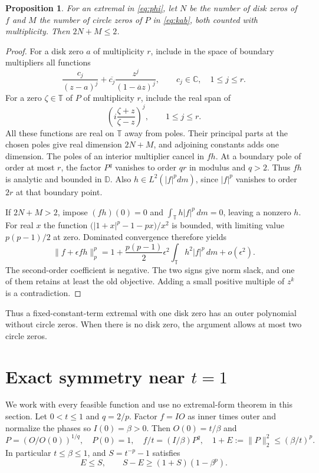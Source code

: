 \documentclass[11pt]{article}
\numberwithin{equation}{section}
\newtheorem{proposition}[theorem]{Proposition}
\theoremstyle{remark}
\newcommand{\D}{\mathbb D}
\newcommand{\T}{\mathbb T}
\newcommand{\C}{\mathbb C}
\newcommand{\norm}[1]{\lVert #1\rVert}
\newcommand{\area}{\,dm}
\begin{document}
\begin{proposition}\label{prop:boundary}
For an extremal in \eqref{eq:phi}, let \(N\) be the number of disk zeros
of \(f\) and \(M\) the number of circle zeros of \(P\) in \eqref{eq:kab},
both counted with multiplicity. Then \(2N+M\le2\).
\end{proposition}
\begin{proof}
For a disk zero \(a\) of multiplicity \(r\), include in the space of
boundary multipliers all functions
\[
  \frac{c_j}{(z-a)^j}
       +\overline{c_j}\frac{z^j}{(1-\overline a z)^j},
      \qquad c_j\in\C,\quad 1\le j\le r .
\]
For a zero \(\zeta\in\T\) of \(P\) of multiplicity \(r\), include the
real span of
\[
  \left(i\frac{\zeta+z}{\zeta-z}\right)^j,\qquad 1\le j\le r .
\]
All these functions are real on \(\T\) away from poles.
Their principal parts at the chosen poles give real dimension \(2N+M\),
and adjoining constants adds one dimension. The poles of an interior
multiplier cancel in \(fh\). At a boundary pole of order at most \(r\),
the factor \(P^q\) vanishes to order \(qr\) in modulus and \(q>2\).
Thus \(fh\) is analytic and bounded in \(\D\).
Also \(h\in L^2(|f|^p dm)\), since \(|f|^p\) vanishes to order \(2r\)
at that boundary point.

If \(2N+M>2\), impose \((fh)(0)=0\) and
\(\int_\T h|f|^p\area=0\), leaving a nonzero \(h\).
For real \(x\) the function
\(\bigl(|1+x|^p-1-px\bigr)/x^2\) is bounded, with limiting value
\(p(p-1)/2\) at zero. Dominated convergence therefore yields
\[
  \norm{f+\epsilon fh}_p^p
   =1+\frac{p(p-1)}2\epsilon^2\int_\T h^2|f|^p\area+o(\epsilon^2).
\]
The second-order coefficient is negative. The two signs give
norm slack, and one of them retains at least the old objective.
Adding a small positive multiple of \(z^k\) is a contradiction.
\end{proof}

Thus a fixed-constant-term extremal with one disk zero has an outer
polynomial without circle zeros. When there is no disk zero, the argument
allows at most two circle zeros.

\section{Exact symmetry near \texorpdfstring{\(t=1\)}{t=1}}

We work with every feasible function and use no extremal-form theorem in
this section. Let \(0<t\le1\) and \(q=2/p\). Factor \(f=IO\) as inner times
outer and normalize the phases so \(I(0)=\beta>0\).
Then \(O(0)=t/\beta\) and
\[
 P=(O/O(0))^{1/q},\quad P(0)=1,\quad
 f/t=(I/\beta)P^q,\quad
 1+E:=\norm{P}_2^2\le(\beta/t)^p .
\]
In particular \(t\le\beta\le1\), and \(S=t^{-p}-1\) satisfies
\begin{equation}\label{eq:budget}
  E\le S,\qquad S-E\ge(1+S)(1-\beta^p).
\end{equation}
\end{document}
